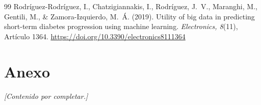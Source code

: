 \documentclass[12pt, letterpaper, twoside]{report}
\begin{document}
\begin{thebibliography}{99}
Rodríguez-Rodríguez, I., Chatzigiannakis, I., Rodríguez, J.~V., Maranghi, M., Gentili, M., \& Zamora-Izquierdo, M.~Á. (2019). Utility of big data in predicting short-term diabetes progression using machine learning. \textit{Electronics, 8}(11), Artículo 1364. \url{https://doi.org/10.3390/electronics8111364}

\end{thebibliography}

\appendix
\chapter{Anexo}

\textit{[Contenido por completar.]}

\end{document}

